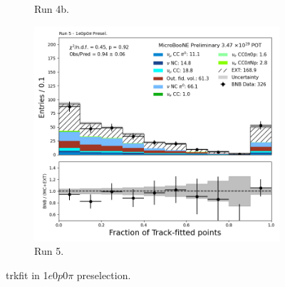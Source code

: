 \begin{figure}[H]
\begin{subfigure}[t]{0.32\linewidth}
        \caption{Run 4b.}
    \end{subfigure}%
    \hspace{0.2cm}%
    \begin{subfigure}[t]{0.32\linewidth}
        \includegraphics[width=\linewidth]{technote/Appendix_Preselection/Figures/1e0p0pi/Run5/trkfit_Run5_1e0p0pi_Presel.png}
        \caption{Run 5.}
    \end{subfigure}
    \caption{trkfit in 1$e$0$p$0$\pi$ preselection.}
\end{figure}

